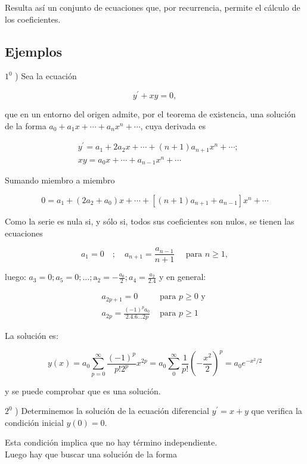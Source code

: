 \documentclass[10pt]{article}
\theoremstyle{plain}
\theoremstyle{definition}
\theoremstyle{remark}
\begin{document}
Resulta así un conjunto de ecuaciones que, por recurrencia, permite el cálculo de los coeficientes.

\subsection*{Ejemplos}
$1^{0}$ ) Sea la ecuación

$$
y^{\prime}+x y=0,
$$

que en un entorno del origen admite, por el teorema de existencia, una solución de la forma $a_{0}+a_{1} x+\cdots+a_{n} x^{n}+\cdots$, cuya derivada es

$$
\begin{aligned}
& y^{\prime}=a_{1}+2 a_{2} x+\cdots+(n+1) a_{n+1} x^{n}+\cdots ; \\
& x y=a_{0} x+\cdots+a_{n-1} x^{n}+\cdots
\end{aligned}
$$

Sumando miembro a miembro

$$
0=a_{1}+\left(2 a_{2}+a_{0}\right) x+\cdots+\left[(n+1) a_{n+1}+a_{n-1}\right] x^{n}+\cdots
$$

Como la serie es nula si, y sólo si, todos sus coeficientes son nulos, se tienen las ecuaciones

$$
a_{1}=0 \quad ; \quad a_{n+1}=\frac{a_{n-1}}{n+1} \quad \text { para } n \geqslant 1,
$$

luego: $a_{3}=0 ; a_{5}=0 ; \ldots ; \mathrm{a}_{2}=-\frac{a_{0}}{2} ; a_{4}=\frac{a_{2}}{2.4}$ y en general:

$$
\begin{array}{ll}
a_{2 p+1}=0 & \text { para } p \geqslant 0 \text { y } \\
a_{2 p}=\frac{(-1)^{p} a_{0}}{2.4 .6 \ldots 2 p} & \text { para } p \geqslant 1
\end{array}
$$

La solución es:

$$
y(x)=a_{0} \sum_{p=0}^{\infty} \frac{(-1)^{p}}{p!2^{p}} x^{2 p}=a_{0} \sum_{0}^{\infty} \frac{1}{p!}\left(-\frac{x^{2}}{2}\right)^{p}=a_{0} e^{-x^{2} / 2}
$$

y se puede comprobar que es una solución.


$2^{0}$ ) Determinemos la solución de la ecuación diferencial $y^{\prime}=x+y$ que verifica la condición inicial $y(0)=0$.

Esta condición implica que no hay término independiente.\\
Luego hay que buscar una solución de la forma
\end{document}
